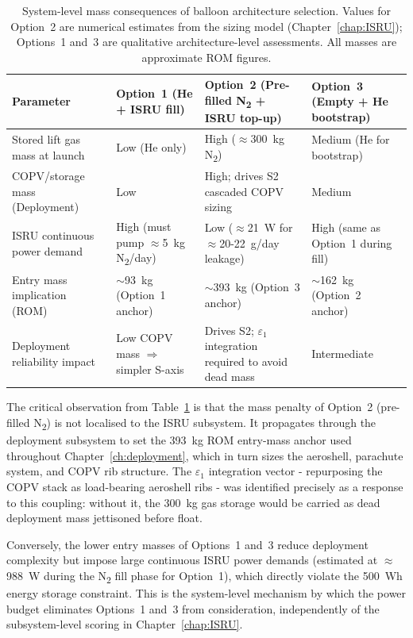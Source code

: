 \begin{table}[ht]
\centering
\caption{System-level mass consequences of balloon architecture selection. Values for Option~2 are numerical estimates from the sizing model (Chapter~\ref{chap:ISRU}); Options~1 and~3 are qualitative architecture-level assessments. All masses are approximate ROM figures.}
\label{tab:mass_coupling}
\renewcommand{\arraystretch}{1.25}
\begin{tabular}{p{3.0cm}p{3.2cm}p{3.2cm}p{3.2cm}}
\hline
\textbf{Parameter} & \textbf{Option~1} \newline (He + ISRU fill) & \textbf{Option~2} \newline (Pre-filled N\textsubscript{2} + ISRU top-up) & \textbf{Option~3} \newline (Empty + He bootstrap) \\
\hline
Stored lift gas mass at launch & Low (He only) & High ($\approx$300~kg N\textsubscript{2}) & Medium (He for bootstrap) \\
COPV/storage mass (Deployment) & Low & High; drives S2 cascaded COPV sizing & Medium \\
ISRU continuous power demand & High (must pump $\approx$5~kg N\textsubscript{2}/day) & Low ($\approx$21~W for $\approx$20-22~g/day leakage) & High (same as Option~1 during fill) \\
Entry mass implication (ROM) & $\sim$93~kg (Option~1 anchor) & $\sim$393~kg (Option~3 anchor) & $\sim$162~kg (Option~2 anchor) \\
Deployment reliability impact & Low COPV mass $\Rightarrow$ simpler S-axis & Drives S2; $\varepsilon_1$ integration required to avoid dead mass & Intermediate \\
\hline
\end{tabular}
\end{table}

The critical observation from Table~\ref{tab:mass_coupling} is that the mass penalty of Option~2 (pre-filled N\textsubscript{2}) is not localised to the ISRU subsystem. It propagates through the deployment subsystem to set the 393~kg ROM entry-mass anchor used throughout Chapter~\ref{ch:deployment}, which in turn sizes the aeroshell, parachute system, and COPV rib structure. The $\varepsilon_1$ integration vector - repurposing the COPV stack as load-bearing aeroshell ribs - was identified precisely as a response to this coupling: without it, the 300~kg gas storage would be carried as dead deployment mass jettisoned before float.

Conversely, the lower entry masses of Options~1 and~3 reduce deployment complexity but impose large continuous ISRU power demands (estimated at $\approx$988~W during the N\textsubscript{2} fill phase for Option~1), which directly violate the 500~Wh energy storage constraint. This is the system-level mechanism by which the power budget eliminates Options~1 and~3 from consideration, independently of the subsystem-level scoring in Chapter~\ref{chap:ISRU}.

